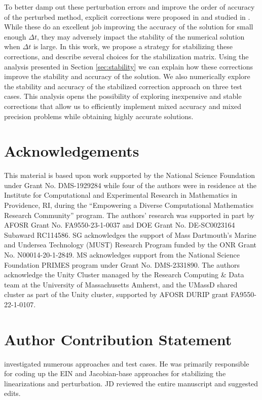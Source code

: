\documentclass{siamart251104}
\newcommand{\dt}{\Delta t}
\begin{document}
To better damp out these perturbation errors and  improve the order of accuracy of the perturbed method, explicit corrections were proposed in 
\cite{Grant2022} and studied in \cite{Burnett1, Burnett2}. 
While these do an excellent job improving the accuracy of the solution for small enough $\dt$, 
they may adversely impact  the stability of the numerical solution when $\dt$ is large.
In this work, we propose a strategy for stabilizing these corrections, 
and describe several choices for the stabilization matrix.  Using the analysis presented in 
Section \eqref{sec:stability} we can explain how these corrections improve the stability 
and accuracy of the solution. We  also numerically explore the stability and accuracy of 
the stabilized correction approach on three test cases. This analysis opens the possibility
of exploring inexpensive and stable corrections that allow us to efficiently
implement mixed accuracy and mixed precision problems while obtaining highly accurate solutions.


\section*{\sc Acknowledgements}
This material is based upon work supported by the 
National Science Foundation under Grant No. DMS-1929284 
while four of the  authors were in residence at the Institute for Computational and Experimental Research in Mathematics in Providence, RI, during the ``Empowering a Diverse Computational Mathematics Research Community'' program.
The authors' research was supported in part by AFOSR Grant No. FA9550-23-1-0037 and
DOE  Grant No. DE-SC0023164 Subaward RC114586.
SG acknowledges the support of  Mass Dartmouth’s Marine and Undersea Technology 
(MUST) Research Program funded by the ONR Grant No. N00014-20-1-2849. 
MS acknowledges support from the National Science Foundation PRIMES program under Grant No. DMS-2331890.
The authors acknowledge the Unity Cluster managed by the Research Computing 
\& Data team at the University of Massachusetts Amherst, and the UMassD shared 
cluster as part of the Unity cluster, supported by  
AFOSR DURIP grant FA9550-22-1-0107.




\section*{\sc Author Contribution Statement} 


 investigated numerous approaches and test cases.
He was primarily responsible for coding up the EIN and Jacobian-base approaches for
stabilizing the linearizations and perturbation. JD reviewed the entire manuscript and 
suggested edits.
\end{document}
